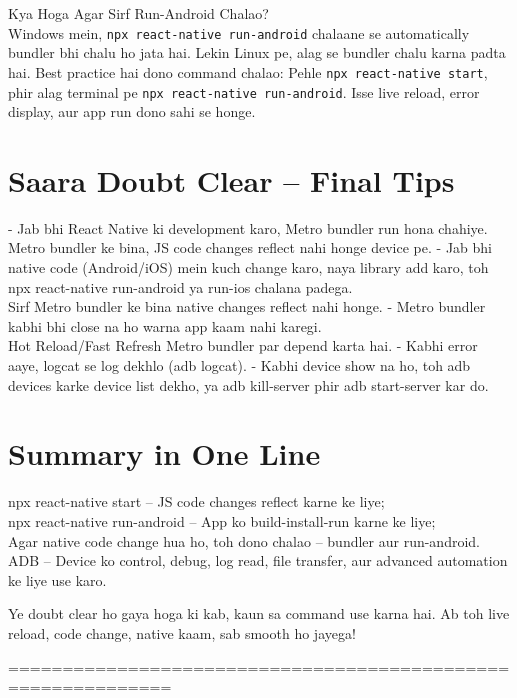 \documentclass[a4paper]{article}
\newcommand\imp[1]{{\color{ImportantRed}#1}}
\begin{document}
\imp{Kya Hoga Agar Sirf Run-Android Chalao?}\\
Windows mein, \texttt{npx react-native run-android} chalaane se automatically bundler bhi chalu ho jata hai.  
Lekin Linux pe, alag se bundler chalu karna padta hai.  
Best practice hai dono command chalao:  
Pehle \texttt{npx react-native start}, phir alag terminal pe \texttt{npx react-native run-android}.  
Isse live reload, error display, aur app run dono sahi se honge.

\vspace{1em}
\section*{Saara Doubt Clear – Final Tips}
- \imp{Jab bhi React Native ki development karo, Metro bundler run hona chahiye.}\\
  Metro bundler ke bina, JS code changes reflect nahi honge device pe.
- \imp{Jab bhi native code (Android/iOS) mein kuch change karo, naya library add karo, toh npx react-native run-android ya run-ios chalana padega.}\\
  Sirf Metro bundler ke bina native changes reflect nahi honge.
- \imp{Metro bundler kabhi bhi close na ho warna app kaam nahi karegi.}\\
  Hot Reload/Fast Refresh Metro bundler par depend karta hai.
- \imp{Kabhi error aaye, logcat se log dekhlo (adb logcat).}
- \imp{Kabhi device show na ho, toh adb devices karke device list dekho, ya adb kill-server phir adb start-server kar do.}

\vspace{1em}
\section*{Summary in One Line}
\imp{npx react-native start} – JS code changes reflect karne ke liye;\\
\imp{npx react-native run-android} – App ko build-install-run karne ke liye;\\
Agar native code change hua ho, toh dono chalao – bundler aur run-android.\\
ADB – Device ko control, debug, log read, file transfer, aur advanced automation ke liye use karo.

\imp{Ye doubt clear ho gaya hoga ki kab, kaun sa command use karna hai. Ab toh live reload, code change, native kaam, sab smooth ho jayega!}

=============================================================
\end{document}
